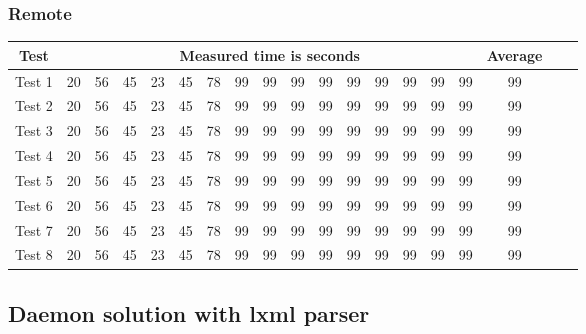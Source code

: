 \subsubsection{Remote}
\begin{center}
    \begin{tabular}{| c | c | c | c | c | c | c | c | c | c | c | c | c | c | c | c | c | c | c |}
    \hline
    Test & \multicolumn{15}{|c|}{Measured time is seconds} & Average \\ \hline
    Test 1 & 20 & 56 & 45 & 23 & 45 & 78 & 99 & 99 & 99 & 99 & 99 & 99 & 99 & 99 & 99 & 99 \\ \hline
    Test 2 & 20 & 56 & 45 & 23 & 45 & 78 & 99 & 99 & 99 & 99 & 99 & 99 & 99 & 99 & 99 & 99 \\ \hline
    Test 3 & 20 & 56 & 45 & 23 & 45 & 78 & 99 & 99 & 99 & 99 & 99 & 99 & 99 & 99 & 99 & 99 \\ \hline
    Test 4 & 20 & 56 & 45 & 23 & 45 & 78 & 99 & 99 & 99 & 99 & 99 & 99 & 99 & 99 & 99 & 99 \\ \hline
    Test 5 & 20 & 56 & 45 & 23 & 45 & 78 & 99 & 99 & 99 & 99 & 99 & 99 & 99 & 99 & 99 & 99 \\ \hline
    Test 6 & 20 & 56 & 45 & 23 & 45 & 78 & 99 & 99 & 99 & 99 & 99 & 99 & 99 & 99 & 99 & 99 \\ \hline
    Test 7 & 20 & 56 & 45 & 23 & 45 & 78 & 99 & 99 & 99 & 99 & 99 & 99 & 99 & 99 & 99 & 99 \\ \hline
    Test 8 & 20 & 56 & 45 & 23 & 45 & 78 & 99 & 99 & 99 & 99 & 99 & 99 & 99 & 99 & 99 & 99 \\ \hline
    \end{tabular}
\end{center}
\subsection{Daemon solution with  lxml parser}
